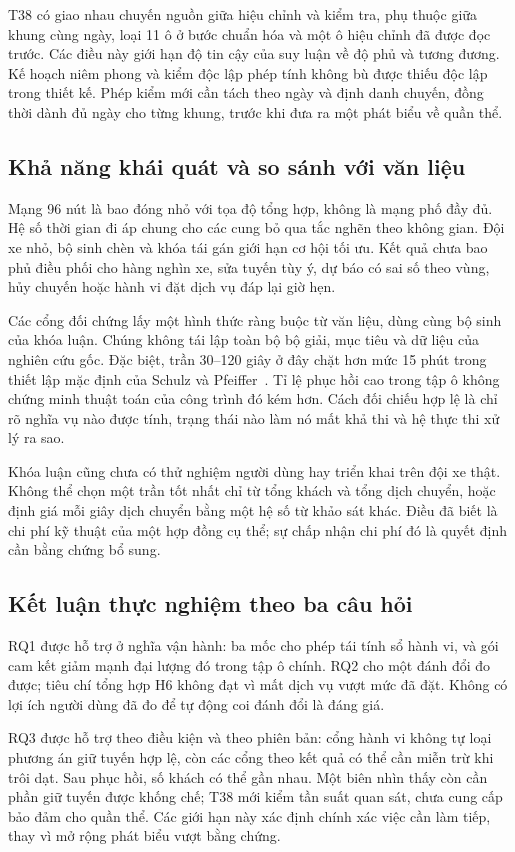 T38 có giao nhau chuyến nguồn giữa hiệu chỉnh và kiểm tra, phụ thuộc giữa
khung cùng ngày, loại 11 ô ở bước chuẩn hóa và một ô hiệu chỉnh đã được
đọc trước. Các điều này giới hạn độ tin cậy của suy luận về độ phủ và
tương đương. Kế hoạch niêm phong và kiểm độc lập phép tính không bù được
thiếu độc lập trong thiết kế. Phép kiểm mới cần tách theo ngày và định
danh chuyến, đồng thời dành đủ ngày cho từng khung, trước khi đưa ra một
phát biểu về quần thể.

\subsection{Khả năng khái quát và so sánh với văn liệu}

Mạng 96 nút là bao đóng nhỏ với tọa độ tổng hợp, không là mạng phố đầy đủ.
Hệ số thời gian đi áp chung cho các cung bỏ qua tắc nghẽn theo không gian.
Đội xe nhỏ, bộ sinh chèn và khóa tái gán giới hạn cơ hội tối ưu. Kết quả
chưa bao phủ điều phối cho hàng nghìn xe, sửa tuyến tùy ý, dự báo có sai số
theo vùng, hủy chuyến hoặc hành vi đặt dịch vụ đáp lại giờ hẹn.

Các cổng đối chứng lấy một hình thức ràng buộc từ văn liệu, dùng cùng bộ
sinh của khóa luận. Chúng không tái lập toàn bộ bộ giải, mục tiêu và dữ
liệu của nghiên cứu gốc. Đặc biệt, trần 30--120 giây ở đây chặt hơn mức
15 phút trong thiết lập mặc định của Schulz và Pfeiffer~\cite{schulz2026}.
Tỉ lệ phục hồi cao trong tập ô không chứng minh thuật toán của công trình
đó kém hơn. Cách đối chiếu hợp lệ là chỉ rõ nghĩa vụ nào được tính, trạng
thái nào làm nó mất khả thi và hệ thực thi xử lý ra sao.

Khóa luận cũng chưa có thử nghiệm người dùng hay triển khai trên đội xe
thật. Không thể chọn một trần tốt nhất chỉ từ tổng khách và tổng dịch
chuyển, hoặc định giá mỗi giây dịch chuyển bằng một hệ số từ khảo sát
khác. Điều đã biết là chi phí kỹ thuật của một hợp đồng cụ thể; sự chấp
nhận chi phí đó là quyết định cần bằng chứng bổ sung.

\subsection{Kết luận thực nghiệm theo ba câu hỏi}

RQ1 được hỗ trợ ở nghĩa vận hành: ba mốc cho phép tái tính sổ hành vi, và
gói cam kết giảm mạnh đại lượng đó trong tập ô chính. RQ2 cho một đánh
đổi đo được; tiêu chí tổng hợp H6 không đạt vì mất dịch vụ vượt mức đã
đặt. Không có lợi ích người dùng đã đo để tự động coi đánh đổi là đáng giá.

RQ3 được hỗ trợ theo điều kiện và theo phiên bản: cổng hành vi không tự
loại phương án giữ tuyến hợp lệ, còn các cổng theo kết quả có thể cần
miễn trừ khi trôi dạt. Sau phục hồi, số khách có thể gần nhau. Một biên
nhìn thấy còn cần phần giữ tuyến được khống chế; T38 mới kiểm tần suất
quan sát, chưa cung cấp bảo đảm cho quần thể. Các giới hạn này xác định
chính xác việc cần làm tiếp, thay vì mở rộng phát biểu vượt bằng chứng.
